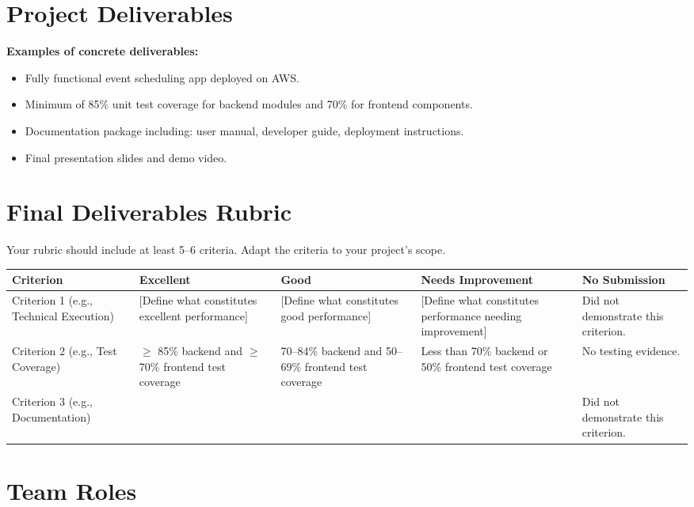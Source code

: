 \documentclass{article}
\begin{document}
\section*{Project Deliverables}
\textbf{Examples of concrete deliverables:}
\begin{itemize}
    \item Fully functional event scheduling app deployed on AWS.  
    \item Minimum of 85\% unit test coverage for backend modules and 70\% for frontend components.  
    \item Documentation package including: user manual, developer guide, deployment instructions.  
    \item Final presentation slides and demo video.  
\end{itemize}



\section*{Final Deliverables Rubric}
Your rubric should include at least 5--6 criteria. Adapt the criteria to your project’s scope.  

\begin{tabularx}{\textwidth}{|X|X|X|X|X|}
    \hline
    \textbf{Criterion} & \textbf{Excellent} & \textbf{Good} & \textbf{Needs Improvement} & \textbf{No Submission}\\
    \hline
  Criterion 1 (e.g., Technical Execution) & [Define what constitutes excellent performance] & [Define what constitutes good performance] & [Define what constitutes performance needing improvement] & Did not demonstrate this criterion. \\
    \hline     
      Criterion 2 (e.g., Test Coverage) & $\geq$ 85\% backend and $\geq$ 70\% frontend test coverage & 70--84\% backend and 50--69\% frontend test coverage & Less than 70\% backend or 50\% frontend test coverage & No testing evidence. \\
    \hline
    Criterion 3 (e.g., Documentation) &  &  &  & Did not demonstrate this criterion. \\
    \hline
    
\end{tabularx}



\section*{Team Roles}
\end{document}
